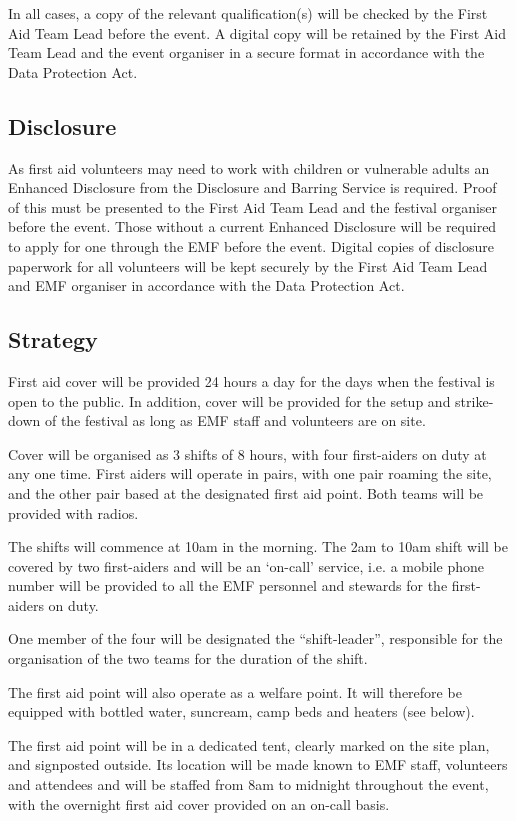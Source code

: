 In all cases, a copy of the relevant qualification(s) will be checked by the
First Aid Team Lead before the event. A digital copy will be retained by the
First Aid Team Lead and the event organiser in a secure format in accordance
with the Data Protection Act.

\subsection{Disclosure}
As first aid volunteers may need to work with children or vulnerable adults an
Enhanced Disclosure from the Disclosure and Barring Service is required. Proof
of this must be presented to the First Aid Team Lead and the festival organiser
before the event. Those without a current Enhanced Disclosure will be required
to apply for one through the EMF before the event. Digital copies of disclosure
paperwork for all volunteers will be kept securely by the First Aid Team Lead and
EMF organiser in accordance with the Data Protection Act.

\subsection{Strategy}
First aid cover will be provided 24 hours a day for the days when the festival
is open to the public. In addition, cover will be provided for the setup and
strike-down of the festival as long as EMF staff and volunteers are on site.

Cover will be organised as 3 shifts of 8 hours, with four first-aiders on duty
at any one time. First aiders will operate in pairs, with one pair roaming the
site, and the other pair based at the designated first aid point. Both teams
will be provided with radios.

The shifts will commence at 10am in the morning. The 2am to 10am shift will
be covered by two first-aiders and will be an `on-call’ service, i.e. a mobile
phone number will be provided to all the EMF personnel and stewards for the
first-aiders on duty.

One member of the four will be designated the ``shift-leader'', responsible for
the organisation of the two teams for the duration of the shift.

The first aid point will also operate as a welfare point. It will therefore be
equipped with bottled water, suncream, camp beds and heaters (see below).

The first aid point will be in a dedicated tent, clearly marked on the site
plan, and signposted outside. Its location will be made known to EMF staff,
volunteers and attendees and will be staffed from 8am to midnight throughout
the event, with the overnight first aid cover provided on an on-call basis.

